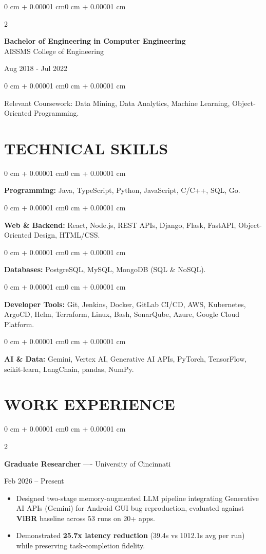 \documentclass[10pt, letterpaper]{article}
\newenvironment{highlights}{
    \begin{itemize}[
        topsep=0.10 cm,
        parsep=0.06 cm,
        partopsep=0pt,
        itemsep=0.06 cm,
        leftmargin=12pt
    ]
}{
    \end{itemize}
}
\newenvironment{onecolentry}{
    \begin{adjustwidth}{0 cm + 0.00001 cm}{0 cm + 0.00001 cm}
}{
    \end{adjustwidth}
}
\newenvironment{twocolentry}[2][]{
    \onecolentry
    \def\secondColumn{#2}
    \setcolumnwidth{\fill, 4.5 cm}
    \begin{paracol}{2}
}{
    \switchcolumn \raggedleft \secondColumn
    \end{paracol}
    \endonecolentry
}
\begin{document}
\begin{twocolentry}{
    Aug 2018 - Jul 2022
}
    \textbf{Bachelor of Engineering in Computer Engineering} \\
    AISSMS College of Engineering
\end{twocolentry}
\begin{onecolentry}
Relevant Coursework: Data Mining, Data Analytics, Machine Learning, Object-Oriented Programming.
\end{onecolentry}
\section{TECHNICAL SKILLS}
\begin{onecolentry}
\textbf{Programming:} Java, TypeScript, Python, JavaScript, C/C++, SQL, Go.
\end{onecolentry}
\vspace{0.06 cm}
\begin{onecolentry}
\textbf{Web \& Backend:} React, Node.js, REST APIs, Django, Flask, FastAPI, Object-Oriented Design, HTML/CSS.
\end{onecolentry}
\vspace{0.06 cm}
\begin{onecolentry}
\textbf{Databases:} PostgreSQL, MySQL, MongoDB (SQL \& NoSQL).
\end{onecolentry}
\vspace{0.06 cm}
\begin{onecolentry}
\textbf{Developer Tools:} Git, Jenkins, Docker, GitLab CI/CD, AWS, Kubernetes, ArgoCD, Helm, Terraform, Linux, Bash, SonarQube, Azure, Google Cloud Platform.
\end{onecolentry}
\vspace{0.06 cm}
\begin{onecolentry}
\textbf{AI \& Data:} Gemini, Vertex AI, Generative AI APIs, PyTorch, TensorFlow, scikit-learn, LangChain, pandas, NumPy.
\end{onecolentry}

\section{WORK EXPERIENCE}
\begin{twocolentry}{Feb 2026 -- Present}
\textbf{Graduate Researcher} ---- University of Cincinnati
\end{twocolentry}
\begin{highlights}
  \item Designed two-stage memory-augmented LLM pipeline integrating Generative AI APIs (Gemini) for Android GUI bug reproduction, evaluated against \textbf{ViBR} baseline across 53 runs on 20+ apps.
  \item Demonstrated \textbf{25.7x latency reduction} (39.4s vs 1012.1s avg per run) while preserving task-completion fidelity.
\end{highlights}
\end{document}
